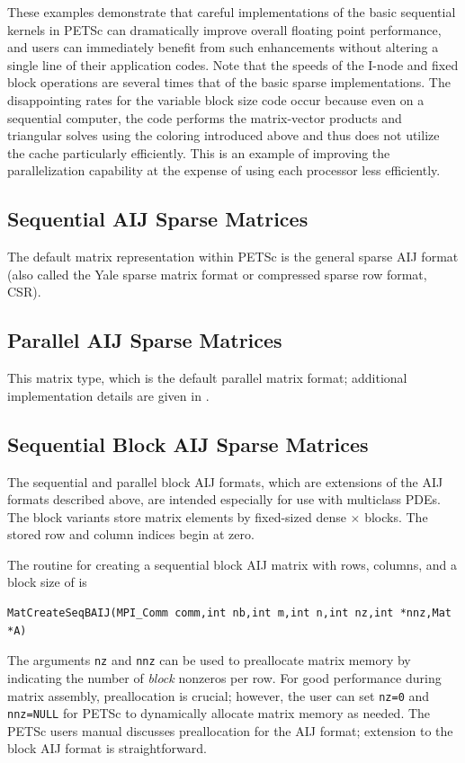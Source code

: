 These examples demonstrate that careful implementations of the basic
sequential kernels in PETSc can dramatically improve overall floating
point performance, and users can immediately benefit from such
enhancements without altering a single line of their application
codes.  Note that the speeds of the I-node and fixed block operations
are several times that of the basic sparse implementations.  The
disappointing rates for the variable block size code occur because
even on a sequential computer, the code performs the matrix-vector
products and triangular solves using the coloring introduced above and
thus does not utilize the cache particularly efficiently.  This is an
example of improving the parallelization capability at the expense of
using each processor less efficiently.

\subsection{Sequential AIJ Sparse Matrices}

The default matrix representation within PETSc is the general sparse
AIJ format (also called the Yale sparse matrix format or compressed
sparse row format, CSR).

\subsection{Parallel AIJ Sparse Matrices}

This matrix type, which is the
default parallel matrix format; additional implementation details are
given in \cite{petsc-efficient}.

\subsection{Sequential Block AIJ Sparse Matrices}

The sequential and parallel block AIJ formats, which are extensions of
the AIJ formats described above, are intended especially for use with
multiclass PDEs.  The block variants store matrix elements by
fixed-sized dense  $\times$  blocks.  The stored row
and column indices begin at zero.

The routine for creating a sequential block AIJ matrix with 
rows,  columns, and a block size of  is
\begin{lstlisting}
MatCreateSeqBAIJ(MPI_Comm comm,int nb,int m,int n,int nz,int *nnz,Mat *A)
\end{lstlisting}
The arguments \lstinline{nz} and \lstinline{nnz} can be used to preallocate matrix
memory by indicating the number of {\em block} nonzeros per row.  For good
performance during matrix assembly, preallocation is crucial; however, the
user can set \lstinline{nz=0} and \lstinline{nnz=NULL} for PETSc to dynamically
allocate matrix memory as needed.  The PETSc users manual
discusses preallocation for the AIJ format; extension to the block AIJ
format is straightforward.

